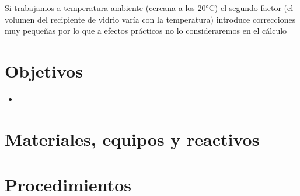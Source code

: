 Si trabajamos a temperatura ambiente (cercana a los 20°C) el segundo factor (el volumen del recipiente de vidrio varía con la temperatura) introduce correcciones muy pequeñas por lo que a efectos prácticos no lo consideraremos en el cálculo

\section{Objetivos}

\begin{itemize}
    \item 
\end{itemize}

\section{Materiales, equipos y reactivos}

\begin{table}[H]
\end{table}

\section{Procedimientos}

